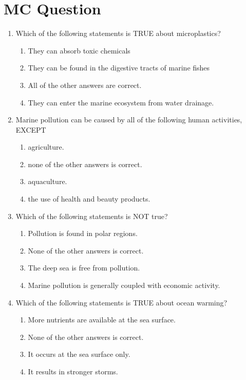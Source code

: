 \documentclass{report}
\begin{document}
\section{MC Question}
\begin{enumerate}
    \item Which of the following statements is TRUE about microplastics?
    \begin{enumerate}
        \item   They can absorb toxic chemicals 
        \item   They can be found in the digestive tracts of marine fishes 
        \item   All of the other answers are correct. 
        \item   They can enter the marine ecosystem from water drainage. 
    \end{enumerate}
    \item Marine pollution can be caused by all of the following human activities, EXCEPT
    \begin{enumerate}
        \item   agriculture. 
        \item   none of the other answers is correct. 
        \item   aquaculture. 
        \item   the use of health and beauty products. 
    \end{enumerate}
    \item Which of the following statements is NOT true?
    \begin{enumerate}
        \item   Pollution is found in polar regions. 
        \item   None of the other answers is correct. 
        \item   The deep sea is free from pollution. 
        \item   Marine pollution is generally coupled with economic activity. 
    \end{enumerate}
    \item Which of the following statements is TRUE about ocean warming?
    \begin{enumerate}
        \item   More nutrients are available at the sea surface. 
        \item   None of the other answers is correct. 
        \item   It occurs at the sea surface only. 
        \item   It results in stronger storms. 

\end{enumerate}
\end{enumerate}
\end{document}
